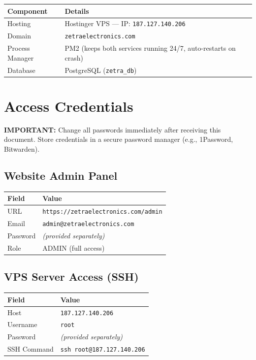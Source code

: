 \documentclass[12pt,a4paper]{article}
\begin{document}
\vspace{0.5em}

\begin{tabular}{@{}L{4cm} L{9cm}@{}}
\toprule
\textbf{Component} & \textbf{Details} \\
\midrule
Hosting & Hostinger VPS — IP: \texttt{187.127.140.206} \\
Domain & \texttt{zetraelectronics.com} \\
Process Manager & PM2 (keeps both services running 24/7, auto-restarts on crash) \\
Database & PostgreSQL (\texttt{zetra\_db}) \\
\bottomrule
\end{tabular}

\section{Access Credentials}

\begin{warningbox}
\textbf{IMPORTANT:} Change all passwords immediately after receiving this document. Store credentials in a secure password manager (e.g., 1Password, Bitwarden).
\end{warningbox}

\subsection{Website Admin Panel}

\begin{tabular}{@{}L{4cm} L{9cm}@{}}
\toprule
\textbf{Field} & \textbf{Value} \\
\midrule
URL & \texttt{https://zetraelectronics.com/admin} \\
Email & \texttt{admin@zetraelectronics.com} \\
Password & \textit{(provided separately)} \\
Role & ADMIN (full access) \\
\bottomrule
\end{tabular}

\subsection{VPS Server Access (SSH)}

\begin{tabular}{@{}L{4cm} L{9cm}@{}}
\toprule
\textbf{Field} & \textbf{Value} \\
\midrule
Host & \texttt{187.127.140.206} \\
Username & \texttt{root} \\
Password & \textit{(provided separately)} \\
SSH Command & \texttt{ssh root@187.127.140.206} \\
\bottomrule
\end{tabular}
\end{document}

